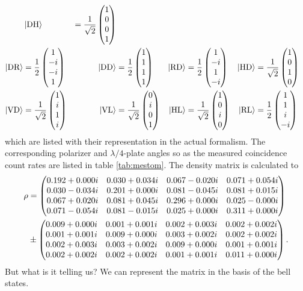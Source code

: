 \begin{align*}
    &\state{DH}
    &=\frac{1}{\sqrt{2}}\begin{pmatrix} 1\\ 0\\ 0\\ 1\end{pmatrix}
    \\
\state{DR}
    &=\frac{1}{2}\begin{pmatrix} 1\\-i\\-i\\ 1\end{pmatrix}
    &\state{DD}
    &=\frac{1}{2}\begin{pmatrix} 1\\ 1\\ 1\\ 1\end{pmatrix}
    &\state{RD}
    &=\frac{1}{2}\begin{pmatrix} 1\\-i\\ 1\\-i\end{pmatrix}
    &\state{HD}
    &=\frac{1}{\sqrt{2}}\begin{pmatrix} 1\\ 0\\ 1\\ 0\end{pmatrix}
    \\
\state{VD}
    &=\frac{1}{\sqrt{2}}\begin{pmatrix} 1\\ i\\ 1\\ i\end{pmatrix}
    &\state{VL}
    &=\frac{1}{\sqrt{2}}\begin{pmatrix} 0\\ i\\ 0\\ 1\end{pmatrix}
    &\state{HL}
    &=\frac{1}{\sqrt{2}}\begin{pmatrix} 1\\ 0\\ i\\ 0\end{pmatrix}
    &\state{RL}
    &=\frac{1}{2}\begin{pmatrix} 1\\ 1\\ i\\-i\end{pmatrix}
\end{align*}
which are listed with their representation in the actual formalism.
The corresponding polarizer and $\lambda/4$-plate angles so as the measured coincidence count rates are listed in table \vref{tab:mestom}.
The density matrix is calculated to
\begin{align*}
\rho
    &=\rhonormal\\
    &\pm \drhonormal .
\end{align*}
But what is it telling us?
We can represent the matrix in the basis of the bell states.



